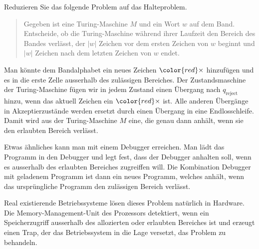 Reduzieren Sie das folgende Problem auf das Halteproblem.

\begin{quote}
Gegeben ist eine Turing-Maschine $M$ und ein Wort $w$ auf dem Band.
Entscheide, ob die Turing-Maschine während ihrer Laufzeit den 
Bereich des Bandes verlässt, der $|w|$ Zeichen vor dem ersten
Zeichen von $w$ beginnt und $|w|$ Zeichen nach dem letzten Zeichen
von $w$ endet.
\end{quote}

\begin{center}
\end{center}


\begin{loesung}
Man könnte dem Bandalphabet ein neues Zeichen $\color{red}\times$
hinzufügen und es in die erste Zelle ausserhalb des zulässigen 
Bereiches.
Der Zustandsmaschine der Turing-Maschine fügen wir in jedem Zustand
einen Übergang nach $q_{\text{reject}}$ hinzu, wenn das aktuell Zeichen
ein ${\color{red}\times}$ ist.
Alle anderen Übergänge in Akzeptierzustände werden ersetzt durch einen
Übergang in eine Endlosschleife.
Damit wird aus der Turing-Maschine $M$ eine, die genau dann anhält,
wenn sie den erlaubten Bereich verlässt.

Etwas ähnliches kann man mit einem Debugger erreichen.
Man lädt das Programm in den Debugger und legt fest, dass
der Debugger anhalten soll, wenn es ausserhalb des erlaubten Bereiches
zugreiffen will.
Die Kombination Debugger mit geladenem Programm ist dann ein neues
Programm, welches anhält, wenn das ursprüngliche Programm den zulässigen
Bereich verlässt.

Real existierende Betriebssysteme lösen dieses Problem natürlich in 
Hardware.
Die Memory-Management-Unit des Prozessors detektiert, wenn ein
Speicherzugriff ausserhalb des allozierten oder erlaubten Bereiches ist 
und erzeugt einen Trap, der das Betriebssystem in die Lage versetzt,
das Problem zu behandeln.
\end{loesung}
